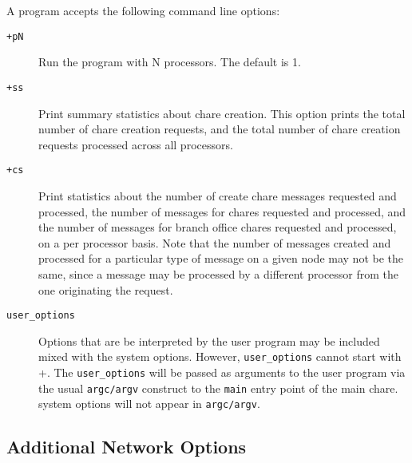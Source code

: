 A \charmpp{} program accepts the following command line options:
\begin{description}

\item[{\tt +pN}] Run the program with N processors. The default is 1.

\item[{\tt +ss}] Print summary statistics about chare creation.  This option
prints the total number of chare creation requests, and the total number of
chare creation requests processed across all processors.

\item[{\tt +cs}] Print statistics about the number of create chare messages
requested and processed, the number of messages for chares requested and 
processed, and the number of messages for branch office chares requested and
processed, on a per processor basis.  Note that the number of messages 
created and processed for a particular type of message on a given node 
may not be the same, since a message may be processed by a different
processor from the one originating the request.

\item[{\tt user\_options}] Options that are be interpreted by the user
program may be included mixed with the system options. 
However, {\tt user\_options} cannot start with +.
The {\tt user\_options} will be passed as arguments to the user program 
via the usual {\tt argc/argv} construct to the {\tt main}
entry point of the main chare. 
\charmpp{} system options will not appear in {\tt argc/argv}.

\end{description}



\subsection{Additional Network Options}
\label{network command line options}

